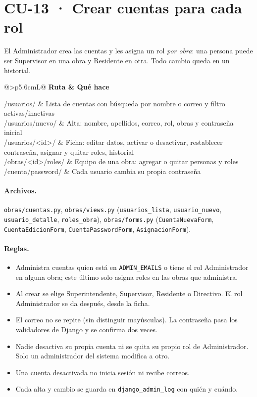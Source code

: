 \documentclass[11pt,letterpaper]{article}
\makeatletter
\newcommand{\cod}[1]{\texttt{\small #1}}
\newcommand{\rutas}[1]{%
\begin{center}\small\rowcolors{2}{grisfondo}{white}
\begin{tabularx}{\linewidth}{@{}>{\ttfamily\footnotesize}p{5.6cm}L@{}}
\toprule\normalfont\sffamily\bfseries Ruta & \sffamily\bfseries Qué hace\\\midrule
#1
\bottomrule\end{tabularx}\end{center}}
\makeatother
\begin{document}
\section{CU-13 · Crear cuentas para cada rol}
El Administrador crea las cuentas y les asigna un rol \emph{por obra}: una persona puede ser Supervisor en una obra y Residente en otra. Todo cambio queda en un historial.

\rutas{
/usuarios/ & Lista de cuentas con búsqueda por nombre o correo y filtro activas/inactivas\\
/usuarios/nuevo/ & Alta: nombre, apellidos, correo, rol, obras y contraseña inicial\\
/usuarios/<id>/ & Ficha: editar datos, activar o desactivar, restablecer contraseña, asignar y quitar roles, historial\\
/obras/<id>/roles/ & Equipo de una obra: agregar o quitar personas y roles\\
/cuenta/password/ & Cada usuario cambia su propia contraseña\\
}

\paragraph{Archivos.} \cod{obras/cuentas.py}, \cod{obras/views.py} (\cod{usuarios\_lista}, \cod{usuario\_nuevo}, \cod{usuario\_detalle}, \cod{roles\_obra}), \cod{obras/forms.py} (\cod{CuentaNuevaForm}, \cod{CuentaEdicionForm}, \cod{CuentaPasswordForm}, \cod{AsignacionForm}).

\paragraph{Reglas.}
\begin{itemize}
  \item Administra cuentas quien está en \cod{ADMIN\_EMAILS} o tiene el rol Administrador en alguna obra; este último solo asigna roles en las obras que administra.
  \item Al crear se elige Superintendente, Supervisor, Residente o Directivo. El rol Administrador se da después, desde la ficha.
  \item El correo no se repite (sin distinguir mayúsculas). La contraseña pasa los validadores de Django y se confirma dos veces.
  \item Nadie desactiva su propia cuenta ni se quita su propio rol de Administrador. Solo un administrador del sistema modifica a otro.
  \item Una cuenta desactivada no inicia sesión ni recibe correos.
  \item Cada alta y cambio se guarda en \cod{django\_admin\_log} con quién y cuándo.
\end{itemize}
\end{document}
